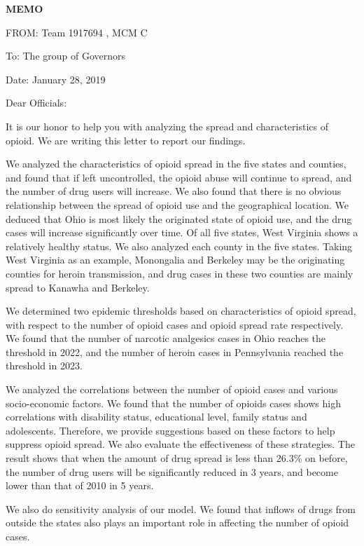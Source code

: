 \documentclass[13pt]{ctexart}
\begin{document}
{\centering \fontsize{18pt}{14pt}\selectfont \textbf{MEMO}\par}

\noindent FROM: Team {} 1917694 , MCM C

\noindent To: The group of Governors

\noindent Date: January 28, 2019

\vspace{10pt}

Dear Officials:

It is our honor to help you with analyzing the spread and characteristics of opioid. We are writing this letter to report our findings.

We analyzed the characteristics of opioid spread in the five states and counties, and found that if left uncontrolled, the opioid abuse will continue to spread, and the number of drug users will increase. We also found that there is no obvious relationship between the spread of opioid use and the geographical location. We deduced that Ohio is most likely the originated state of opioid use, and the drug cases will increase significantly over time. Of all five states, West Virginia shows a relatively healthy status. We also analyzed each county in the five states. Taking West Virginia as an example, Monongalia and Berkeley may be the originating counties for heroin transmission, and drug cases in these two counties are mainly spread to Kanawha and Berkeley.

We determined two epidemic thresholds based on characteristics of opioid spread, with respect to the number of opioid cases and opioid spread rate respectively. We found that the number of narcotic analgesics cases in Ohio reaches the threshold in 2022, and the number of heroin cases in Pennsylvania reached the threshold in 2023.

We analyzed the correlations between the number of opioid cases and various socio-economic factors. We found that the number of opioids cases shows high correlations with disability status, educational level, family status and adolescents. Therefore, we provide suggestions based on these factors to help suppress opioid spread. We also evaluate the effectiveness of these strategies. The result shows that when the amount of drug spread is less than 26.3\% on before, the number of drug users will be significantly reduced in 3 years, and become lower than that of 2010 in 5 years. 

We also do sensitivity analysis of our model. We found that inflows of drugs from outside the states also plays an important role in affecting the number of opioid cases.
\end{document}
